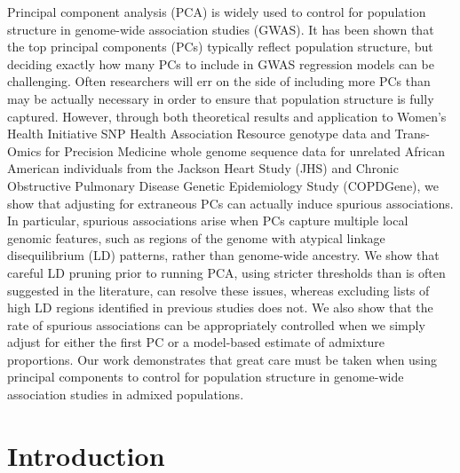 \documentclass[12pt]{article}
\begin{document}

Principal component analysis (PCA) is widely used to control for population structure in genome-wide association studies (GWAS). It has been shown that the top principal components (PCs) typically reflect population structure, but deciding exactly how many PCs to include in GWAS regression models can be challenging. Often researchers will err on the side of including more PCs than may be actually necessary in order to ensure that population structure is fully captured. However, through both theoretical results and application to Women's Health Initiative SNP Health Association Resource genotype data and Trans-Omics for Precision Medicine whole genome sequence data for unrelated African American individuals from the Jackson Heart Study (JHS) and Chronic Obstructive Pulmonary Disease Genetic Epidemiology Study (COPDGene), we show that adjusting for extraneous PCs can actually induce spurious associations. In particular, spurious associations arise when PCs capture multiple local genomic features, such as regions of the genome with atypical linkage disequilibrium (LD) patterns, rather than genome-wide ancestry. We show that careful LD pruning prior to running PCA, using stricter thresholds than is often suggested in the literature, can resolve these issues, whereas excluding lists of high LD regions identified in previous studies does not. We also show that the rate of spurious associations can be appropriately controlled when we simply adjust for either the first PC or a model-based estimate of admixture proportions. Our work demonstrates that great care must be taken when using principal components to control for population structure in genome-wide association studies in admixed populations.


\newpage
\section{Introduction}

\end{document}
